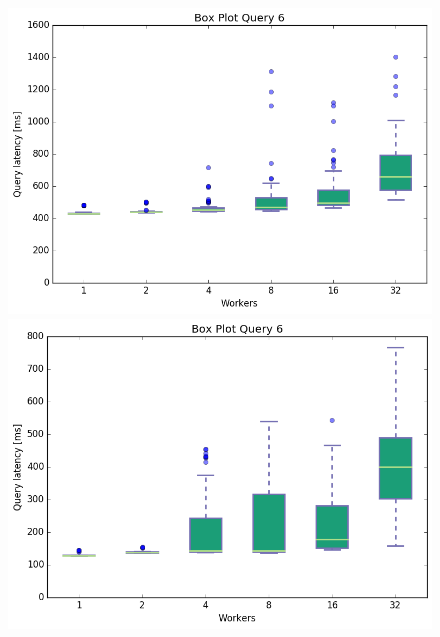\documentclass[11pt,singlecolumn]{scrartcl}
\begin{document}
\begin{figure}[!tbp]
  \centering
  \RawFloats
  \begin{minipage}[b]{0.5\textwidth}
    \includegraphics[width=\textwidth]{boxesjl/q6}
  \end{minipage}
  \hfill
  \begin{minipage}[b]{0.5\textwidth}
    \includegraphics[width=\textwidth]{boxesjs/q6}
  \end{minipage}
\end{figure}
\clearpage
\end{document}
